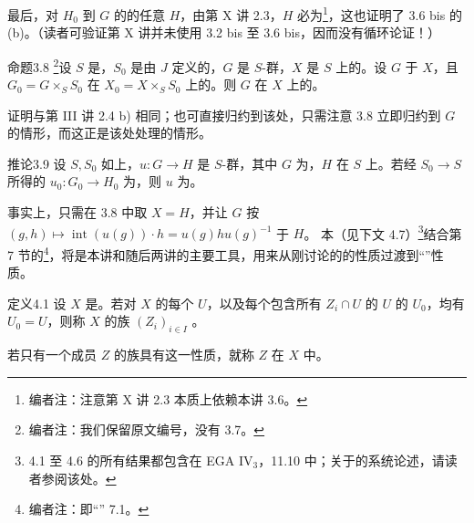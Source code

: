 最后，对 $H_0$ 到 $G$ 的的任意 $H$，由第 X 讲 2.3，$H$ 必为\footnote{编者注：注意第 X 讲 2.3 本质上依赖本讲 3.6。}，这也证明了 3.6 bis 的 (b)。（读者可验证第 X 讲并未使用 3.2 bis 至 3.6 bis，因而没有循环论证！）
\begin{SGAresult}{命题}{3.8}
\footnote{编者注：我们保留原文编号，没有 3.7。}设 $S$ 是，$S_0$ 是由 $J$ 定义的，$G$ 是 $S$-群，$X$ 是 $S$ 上的。设 $G$ 于 $X$，且 $G_0=G\times_S S_0$ 在 $X_0=X\times_S S_0$ 上的。则 $G$ 在 $X$ 上的。
\end{SGAresult}
证明与第 III 讲 2.4 b) 相同；也可直接归约到该处，只需注意 3.8 立即归约到 $G$ 的情形，而这正是该处处理的情形。
\begin{SGAresult}{推论}{3.9}
设 $S,S_0$ 如上，$u:G\to H$ 是 $S$-群，其中 $G$ 为，$H$ 在 $S$ 上。若经 $S_0\to S$ 所得的 $u_0:G_0\to H_0$ 为，则 $u$ 为。
\end{SGAresult}
事实上，只需在 3.8 中取 $X=H$，并让 $G$ 按 $(g,h)\mapsto\operatorname{int}(u(g))\cdot h=u(g)hu(g)^{-1}$ 于 $H$。
本（见下文 4.7）\footnote{4.1 至 4.6 的所有结果都包含在 EGA IV$_3$，11.10 中；关于的系统论述，请读者参阅该处。}结合第 7 节的\footnote{编者注：即“” 7.1。}，将是本讲和随后两讲的主要工具，用来从刚讨论的的性质过渡到“”性质。
\begin{SGAresult}{定义}{4.1}
设 $X$ 是。若对 $X$ 的每个 $U$，以及每个包含所有 $Z_i\cap U$ 的 $U$ 的 $U_0$，均有 $U_0=U$，则称 $X$ 的族 $(Z_i)_{i\in I}$ 。

若只有一个成员 $Z$ 的族具有这一性质，就称 $Z$ 在 $X$ 中。
\end{SGAresult}
